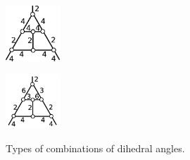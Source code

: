 \documentclass[suppldata, dvipdfmx]{interact}
\theoremstyle{plain}%
\newtheorem{lemma}[theorem]{Lemma}
\theoremstyle{definition}
\theoremstyle{remark}
\theoremstyle{problemstyle}
\begin{document}
\begin{figure}[h!tbp]
\begin{minipage}[t]{0.99\textwidth}
\begin{minipage}[t]{0.15\textwidth}
   \label{fig:cube_i}
  \end{minipage}
 \hspace*{\fill}
  \begin{minipage}[t]{0.15\textwidth}
   \centering
   \includegraphics[width=0.8in, keepaspectratio]{./img/HexahedraWithSphericalFaces/cube/cube_j.jpg}
   \label{fig:cube_j}
  \end{minipage}
 \hspace*{\fill}
  \begin{minipage}[t]{0.15\textwidth}
   \centering
   \includegraphics[width=0.8in, keepaspectratio]{./img/HexahedraWithSphericalFaces/cube/cube_k.jpg}
   \label{fig:cube_k}
  \end{minipage}
 \hspace*{\fill}
  \caption{Types of combinations of dihedral angles.}
  \label{fig:cubeGraph}
 \end{minipage}
\end{figure}


%
\end{document}

